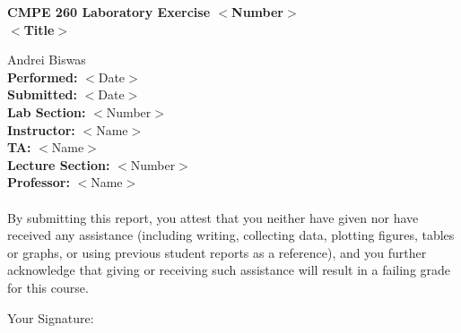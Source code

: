 \documentclass[letterpaper]{article}
\begin{document}
	

	
	\begin{center}
		\textbf{CMPE 260 Laboratory Exercise $<$Number$>$ 
			\\	\vspace{0.5cm} $<$Title$>$}
	\end{center}
	\vspace{12cm}
	\tabto{8cm} Andrei Biswas \\
	\tabto{8cm} \textbf{Performed: }$<$Date$>$ \\
	\tabto{8cm} \textbf{Submitted: }$<$Date$>$ \\
	\vspace{0.5cm}
	\tabto{8cm} \textbf{Lab Section: }$<$Number$>$ \\
	\tabto{8cm} \textbf{Instructor: }$<$Name$>$ \\
	\tabto{8cm} \textbf{TA: }$<$Name$>$ \\
	\vspace{0.5cm}
	\tabto{8cm} \textbf{Lecture Section: }$<$Number$>$ \\
	\tabto{8cm} \textbf{Professor: }$<$Name$>$ \\
	\vspace{1cm} \\
	By submitting this report, you attest that you neither have given nor have received any assistance (including writing, collecting data, plotting figures, tables or graphs, or using previous student reports as a reference), and you further acknowledge that giving or receiving such assistance will result in a failing grade for this course.
		
	\vspace{1cm}
	\tabto{1.5cm} Your Signature: \hrulefill
	
	\renewcommand*\contentsname{Table of Contents \hrulefill}
	\tableofcontents
	
			
	\newpage
	
	
	
	
	
	
\end{document}
